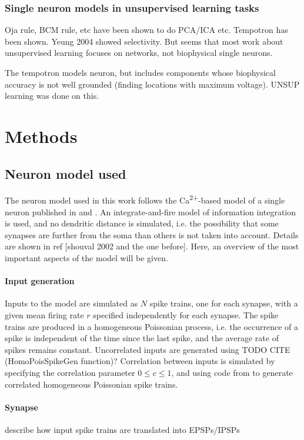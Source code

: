 \documentclass[a4paper,12pt]{report}
\theoremstyle{definition}
\begin{document}
\subsection{Single neuron models in unsupervised learning tasks}
Oja rule, BCM rule, etc have been shown to do PCA/ICA etc. Tempotron has been shown. Yeung 2004 showed selectivity. But seems that most work about unsupervised learning focuses on networks, not biophysical single neurons.

The tempotron \cite{gutig2006tempotron} models neuron, but includes components whose biophysical accuracy is not well grounded (finding locations with maximum voltage). UNSUP learning was done on this.


\chapter{Methods}
\section{Neuron model used}

The neuron model used in this work follows the Ca\textsuperscript{2+}-based model of a single neuron published in \cite{shouval2002unified} and \cite{yeung2004synaptic}. An integrate-and-fire model of information integration is used, and no dendritic distance is simulated, i.e. the possibility that some synapses are further from the soma than others is not taken into account. Details are shown in ref [shouval 2002 and the one before]. Here, an overview of the most important aspects of the model will be given.

\subsubsection{Input generation}
Inputs to the model are simulated as $N$ spike trains, one for each synapse, with a given mean firing rate $r$ specified independently for each synapse. The spike trains are produced in a homogeneous Poissonian process, i.e. the occurrence of a spike is independent of the time since the last spike, and the average rate of spikes remains constant. Uncorrelated inputs are generated using TODO CITE (HomoPoisSpikeGen function)?
Correlation between inputs is simulated by specifying the correlation parameter $0 \leq c \leq 1$, and using code from \cite{macke2009} to generate correlated homogeneous Poissonian spike trains.

\subsubsection{Synapse}
describe how input spike trains are translated into EPSPs/IPSPs
\end{document}
